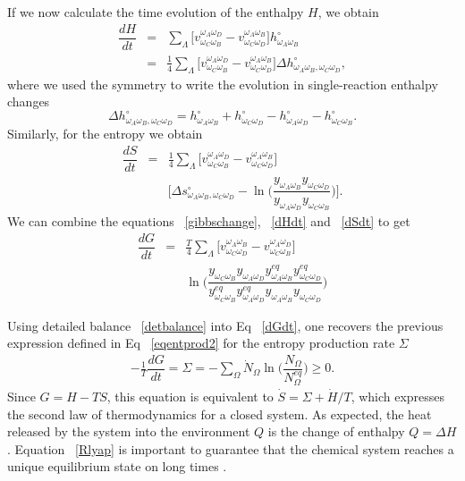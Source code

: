 \documentclass[
	amsmath,
	amssymb,
	a4paper,
	aip,		%
	jcp,		%
	reprint, twocolumn  %
	fleqn,
	showpacs,
	floatfix
]{revtex4-1}
\newcommand{\be}{\begin{equation}}
\newcommand{\ee}{\end{equation}}
\newcommand{\bea}{\begin{eqnarray}}
\newcommand{\eea}{\end{eqnarray}}
\begin{document}
If we now calculate the time evolution of the enthalpy $H$, we obtain
\bea
\dfrac{dH}{dt}&=&  \sum _{\Lambda} \bigg[ v^{\omega_{A} \omega_{D}}_{\omega_{C} \omega_{B}}  -   v^{\omega_{A} \omega_{B}}_{\omega_{C} \omega_{D}} \bigg]  h^{\circ}_{\omega_{A}\omega_{B}} \label{dHdt} \\ \nonumber
&=&\frac{1}{4}  \sum _{\Lambda} \bigg[ v^{\omega_{A} \omega_{D}}_{\omega_{C} \omega_{B}}  -   v^{\omega_{A} \omega_{B}}_{\omega_{C} \omega_{D}} \bigg] \Delta h^{\circ}_{\omega_{A}\omega_{B},\omega_{C}\omega_{D}}, 
\eea
where we used the symmetry to write the evolution in single-reaction enthalpy changes
\be
\Delta h^{\circ}_{\omega_{A}\omega_{B},\omega_{C}\omega_{D}}=h^{\circ}_{\omega_{A}\omega_{B}}+h^{\circ}_{\omega_{C}\omega_{D}}-h^{\circ}_{\omega_{A}\omega_{D}}-h^{\circ}_{\omega_{C}\omega_{B}}. 
\label{dHdef}
\ee
Similarly, for the entropy we obtain
\bea
\dfrac{dS}{dt}& =& \frac{1}{4} \sum _{\Lambda} \bigg[ v^{\omega_{A} \omega_{D}}_{\omega_{C} \omega_{B}}  -   v^{\omega_{A} \omega_{B}}_{\omega_{C} \omega_{D}} \bigg]  \label{dSdt} \\ \nonumber
&&\bigg[\Delta s^{\circ}_{\omega_{A}\omega_{B},\omega_{C} \omega_{D}}
-  \ln \bigg(\dfrac{   y_{\omega_{A} \omega_{B}} y_{\omega_{C} \omega_{D}}}{y_{\omega_{A} \omega_{D}} y_{\omega_{C} \omega_{B}}}\bigg) \bigg].
\eea
We can combine the equations ~\eqref{gibbschange}, ~\eqref{dHdt} and ~\eqref{dSdt} to get
\bea
\dfrac{dG}{dt}&=& \frac{T}{4} \sum _{\Lambda} \bigg[ v^{\omega_{A} \omega_{B}}_{\omega_{C} \omega_{D}}  -   v^{\omega_{A} \omega_{D}}_{\omega_{C} \omega_{B}} \bigg]  \label{dGdt} \\ \nonumber
&&\ln \bigg(\dfrac{ y_{\omega_{C} \omega_{B}} y_{\omega_{A} \omega_{D}} y^{eq}_{\omega_{A} \omega_{B}} y^{eq}_{\omega_{C} \omega_{D}} } {y^{eq}_{\omega_{C} \omega_{B}} y^{eq}_{\omega_{A} \omega_{D}} y_{\omega_{A} \omega_{B}} y_{\omega_{C} \omega_{D}}   }\bigg) 
\eea


Using detailed balance ~\eqref{detbalance} into Eq ~\eqref{dGdt}, 
one recovers the previous expression defined in Eq ~\eqref{eqentprod2} for the entropy production rate $\Sigma$
\begin{equation}
	\begin{split}
-\frac{1}{T} \dfrac{dG}{dt}=\Sigma=-  \sum_{\Omega} \dot{N}_{\Omega} \ln \bigg(\dfrac{ N_{\Omega}}{N^{eq}_{\Omega}} \bigg) \geq 0.
\end{split}
\label{Rlyap}
\end{equation}
Since $G=H-TS$, this equation is equivalent to $\dot{S}= \Sigma + \dot{H}/T$, 
which expresses the second law of thermodynamics for a closed system. 
As expected, the heat released by the system into the environment $Q$ is the change of enthalpy $Q=\Delta H$. 
Equation ~\eqref{Rlyap} is important to guarantee that the chemical system
reaches a unique equilibrium state on long times \cite{Lahiri2015}.
\end{document}

